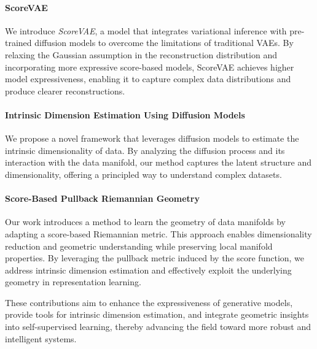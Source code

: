 \paragraph{ScoreVAE}

We introduce \emph{ScoreVAE}, a model that integrates variational inference with pre-trained diffusion models to overcome the limitations of traditional VAEs. By relaxing the Gaussian assumption in the reconstruction distribution and incorporating more expressive score-based models, ScoreVAE achieves higher model expressiveness, enabling it to capture complex data distributions and produce clearer reconstructions.

\paragraph{Intrinsic Dimension Estimation Using Diffusion Models}

We propose a novel framework that leverages diffusion models to estimate the intrinsic dimensionality of data. By analyzing the diffusion process and its interaction with the data manifold, our method captures the latent structure and dimensionality, offering a principled way to understand complex datasets.

\paragraph{Score-Based Pullback Riemannian Geometry}

Our work introduces a method to learn the geometry of data manifolds by adapting a score-based Riemannian metric. This approach enables dimensionality reduction and geometric understanding while preserving local manifold properties. By leveraging the pullback metric induced by the score function, we address intrinsic dimension estimation and effectively exploit the underlying geometry in representation learning.

These contributions aim to enhance the expressiveness of generative models, provide tools for intrinsic dimension estimation, and integrate geometric insights into self-supervised learning, thereby advancing the field toward more robust and intelligent systems.

